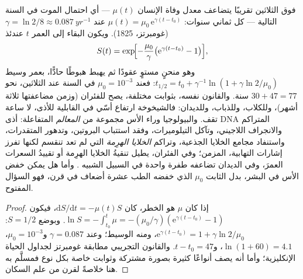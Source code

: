 \begin{proposition}\label{prop:b3:stem-cells:gompertz}
فوق الثلاثين تقريبًا يتضاعف معدل وفاة الإنسان $\mu(t)$ ---
أي احتمال الموت في السنة التالية --- كل ثماني سنوات: $\mu(t) =
\mu_{0}\,\mathrm{e}^{\gamma(t - t_{0})}$ عند $\gamma = \ln 2/8 \approx
\qty{0.087}{yr^{-1}}$ (غومبرتز، 1825). ويكون البقاء إلى العمر $t$ عندئذ
\[
S(t) = \exp\!\Bigl[-\frac{\mu_{0}}{\gamma}\bigl(\mathrm{e}^{\gamma(t - t_{0})} - 1\bigr)\Bigr],
\]
وهو منحنٍ مستوٍ عقودًا ثم يهبط هبوطًا حادًّا، بعمر وسيط
$t_{1/2} = t_{0} + \gamma^{-1}\ln(1 + \gamma\ln 2/\mu_{0})$:
فعند $\mu_{0} = 10^{-3}$ في السنة عند الثلاثين، نحو $30 + 47 = 77$ سنة.
والقانون نفسه، بثوابت مختلفة، يصح للفئران (وزمن مضاعفتها
ثلاثة أشهر)، وللكلاب، وللذباب، وللديدان: فالشيخوخة ارتفاع
أسّي في القابلية للأذى، لا ساعة تقف. والبيولوجيا وراء الأس
مجموعة من \emph{المعالم} المتفاعلة: أذى DNA المتراكم
والانجراف اللاجيني، وتآكل التيلوميرات، وفقد استتباب
البروتين، وتدهور المتقدرات، واستنفاد مجامع الخلايا الجذعية،
وتراكم \emph{الخلايا الهرِمة} التي لم تعد تنقسم لكنها تفرز
إشارات التهابية،  المزمن؛ وفي الفئران، يطيل تنقيةُ
الخلايا الهرِمة أو تقييدُ السعرات العمرَ، وفي الديدان تضاعفه
طفرة واحدة في السبيل الشبيه . وأما هل يمكن خفض
الأس في البشر، بدل الثابت $\mu_{0}$
الذي خفضه الطب عشرة أضعاف في قرن، فهو السؤال المفتوح.
\end{proposition}
\begin{proof}
إذا كان $\mu$ هو الخطر، كان $\mathrm{d}S/\mathrm{d}t = -\mu(t)S$، فيكون $\ln S =
-\int_{t_{0}}^{t}\mu = -(\mu_{0}/\gamma)(\mathrm{e}^{\gamma(t-t_{0})} -
1)$. وبوضع $S = 1/2$: $\mathrm{e}^{\gamma(t-t_{0})} = 1 + \gamma\ln 2/
\mu_{0}$، ومنه الوسيط؛ وعند $\gamma = 0.087$ و$\mu_{0} =
10^{-3}$، $\ln(1 + 60) = 4.1$، و$t - t_{0} = 47$. والقانون التجريبي
مطابقة غومبرتز لجداول الحياة الإنكليزية؛ وأما أنه يصف أنواعًا
كثيرة بصورة مشتركة وثوابت خاصة بكل نوع فمسلَّم به هنا خلاصةً
لقرن من علم السكان.
\end{proof}

